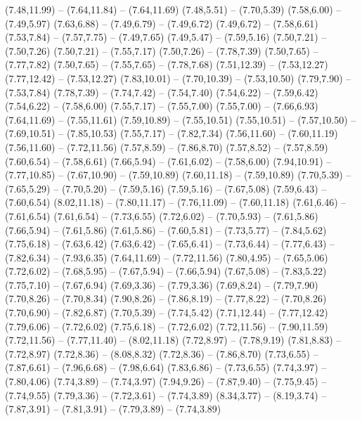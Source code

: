 {  (7.48,11.99) -- (7.64,11.84) -- (7.64,11.69)
  (7.48,5.51) -- (7.70,5.39)
  (7.58,6.00) -- (7.49,5.97)
  (7.63,6.88) -- (7.49,6.79) -- (7.49,6.72)
  (7.49,6.72) -- (7.58,6.61)
  (7.53,7.84) -- (7.57,7.75) -- (7.49,7.65)
  (7.49,5.47) -- (7.59,5.16)
  (7.50,7.21) -- (7.50,7.26)
  (7.50,7.21) -- (7.55,7.17)
  (7.50,7.26) -- (7.78,7.39)
  (7.50,7.65) -- (7.77,7.82)
  (7.50,7.65) -- (7.55,7.65) -- (7.78,7.68)
  (7.51,12.39) -- (7.53,12.27)
  (7.77,12.42) -- (7.53,12.27)
  (7.83,10.01) -- (7.70,10.39) -- (7.53,10.50)
  (7.79,7.90) -- (7.53,7.84)
  (7.78,7.39) -- (7.74,7.42) -- (7.54,7.40)
  (7.54,6.22) -- (7.59,6.42)
  (7.54,6.22) -- (7.58,6.00)
  (7.55,7.17) -- (7.55,7.00)
  (7.55,7.00) -- (7.66,6.93)
  (7.64,11.69) -- (7.55,11.61)
  (7.59,10.89) -- (7.55,10.51)
  (7.55,10.51) -- (7.57,10.50) -- (7.69,10.51) -- (7.85,10.53)
  (7.55,7.17) -- (7.82,7.34)
  (7.56,11.60) -- (7.60,11.19)
  (7.56,11.60) -- (7.72,11.56)
  (7.57,8.59) -- (7.86,8.70)
  (7.57,8.52) -- (7.57,8.59)
  (7.60,6.54) -- (7.58,6.61)
  (7.66,5.94) -- (7.61,6.02) -- (7.58,6.00)
  (7.94,10.91) -- (7.77,10.85) -- (7.67,10.90) -- (7.59,10.89)
  (7.60,11.18) -- (7.59,10.89)
  (7.70,5.39) -- (7.65,5.29) -- (7.70,5.20) -- (7.59,5.16)
  (7.59,5.16) -- (7.67,5.08)
  (7.59,6.43) -- (7.60,6.54)
  (8.02,11.18) -- (7.80,11.17) -- (7.76,11.09) -- (7.60,11.18)
  (7.61,6.46) -- (7.61,6.54)
  (7.61,6.54) -- (7.73,6.55)
  (7.72,6.02) -- (7.70,5.93) -- (7.61,5.86)
  (7.66,5.94) -- (7.61,5.86)
  (7.61,5.86) -- (7.60,5.81) -- (7.73,5.77) -- (7.84,5.62)
  (7.75,6.18) -- (7.63,6.42)
  (7.63,6.42) -- (7.65,6.41) -- (7.73,6.44) -- (7.77,6.43) -- (7.82,6.34) -- (7.93,6.35)
  (7.64,11.69) -- (7.72,11.56)
  (7.80,4.95) -- (7.65,5.06)
  (7.72,6.02) -- (7.68,5.95) -- (7.67,5.94) -- (7.66,5.94)
  (7.67,5.08) -- (7.83,5.22)
  (7.75,7.10) -- (7.67,6.94)
  (7.69,3.36) -- (7.79,3.36)
  (7.69,8.24) -- (7.79,7.90)
  (7.70,8.26) -- (7.70,8.34)
  (7.90,8.26) -- (7.86,8.19) -- (7.77,8.22) -- (7.70,8.26)
  (7.70,6.90) -- (7.82,6.87)
  (7.70,5.39) -- (7.74,5.42)
  (7.71,12.44) -- (7.77,12.42)
  (7.79,6.06) -- (7.72,6.02)
  (7.75,6.18) -- (7.72,6.02)
  (7.72,11.56) -- (7.90,11.59)
  (7.72,11.56) -- (7.77,11.40) -- (8.02,11.18)
  (7.72,8.97) -- (7.78,9.19)
  (7.81,8.83) -- (7.72,8.97)
  (7.72,8.36) -- (8.08,8.32)
  (7.72,8.36) -- (7.86,8.70)
  (7.73,6.55) -- (7.87,6.61) -- (7.96,6.68) -- (7.98,6.64)
  (7.83,6.86) -- (7.73,6.55)
  (7.74,3.97) -- (7.80,4.06)
  (7.74,3.89) -- (7.74,3.97)
  (7.94,9.26) -- (7.87,9.40) -- (7.75,9.45) -- (7.74,9.55)
  (7.79,3.36) -- (7.72,3.61) -- (7.74,3.89)
  (8.34,3.77) -- (8.19,3.74) -- (7.87,3.91) -- (7.81,3.91) -- (7.79,3.89) -- (7.74,3.89)
}
